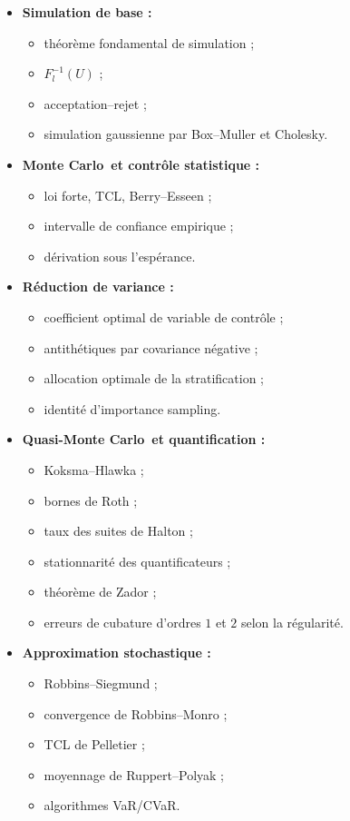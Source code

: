 \documentclass[11pt,a4paper]{article}
\newcommand{\mc}{Monte Carlo}
\newcommand{\qmc}{Quasi-Monte Carlo}
\begin{document}
\begin{itemize}
  \item \textbf{Simulation de base :}
  \begin{itemize}
    \item théorème fondamental de simulation ;
    \item $F_l^{-1}(U)$ ;
    \item acceptation--rejet ;
    \item simulation gaussienne par Box--Muller et Cholesky.
  \end{itemize}

  \item \textbf{\mc\ et contrôle statistique :}
  \begin{itemize}
    \item loi forte, TCL, Berry--Esseen ;
    \item intervalle de confiance empirique ;
    \item dérivation sous l'espérance.
  \end{itemize}

  \item \textbf{Réduction de variance :}
  \begin{itemize}
    \item coefficient optimal de variable de contrôle ;
    \item antithétiques par covariance négative ;
    \item allocation optimale de la stratification ;
    \item identité d'importance sampling.
  \end{itemize}

  \item \textbf{\qmc\ et quantification :}
  \begin{itemize}
    \item Koksma--Hlawka ;
    \item bornes de Roth ;
    \item taux des suites de Halton ;
    \item stationnarité des quantificateurs ;
    \item théorème de Zador ;
    \item erreurs de cubature d'ordres $1$ et $2$ selon la régularité.
  \end{itemize}

  \item \textbf{Approximation stochastique :}
  \begin{itemize}
    \item Robbins--Siegmund ;
    \item convergence de Robbins--Monro ;
    \item TCL de Pelletier ;
    \item moyennage de Ruppert--Polyak ;
    \item algorithmes VaR/CVaR.
  \end{itemize}


\end{itemize}
\end{document}
